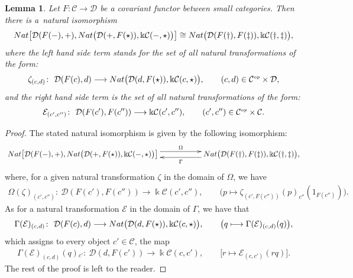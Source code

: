 \documentclass[11pt]{article}
\numberwithin{equation}{section}
\newtheorem{Lemma}[Theorem]{Lemma}
\newcommand{\cD}{{\mathcal D}}
\newcommand{\cE}{{\mathcal E}}
\newcommand{\Sscript}[1]{\scriptscriptstyle{#1}}
\begin{document}
\begin{Lemma}\label{lema:I-II-2}Let $F\colon \mathcal{C} \to \cD$ be a covariant functor between small categories. Then there is a~natural isomorphism
\begin{gather*}
{\rm Nat}\big[ \cD(F(-),+), {\rm Nat} \big( \cD(+, F(\star)), \Bbbk \mathcal{C}(-,\star) \big) \big] \cong {\rm Nat}\big( \cD(F(\dag),F(\ddag)), \Bbbk \mathcal{C}(\dag,\ddag) \big),
\end{gather*}
where the left hand side term stands for the set of all natural transformations of the form:
\begin{gather*}
\zeta_{(c, d)}\colon \ \cD(F(c),d) \longrightarrow{\rm Nat} \big( \cD(d, F(\star)), \Bbbk \mathcal{C}(c,\star) \big), \qquad (c,d) \in \mathcal{C}^{\Sscript{\rm op}} \times \cD,
\end{gather*}
and the right hand side term is the set of all natural transformations of the form:
\begin{gather*}
\cE_{(c', c'')} \colon \ \cD(F(c'), F(c'')) \longrightarrow \Bbbk \mathcal{C}(c',c''), \qquad (c',c'') \in \mathcal{C}^{\Sscript{\rm op}} \times \mathcal{C}.
\end{gather*}
\end{Lemma}
\begin{proof}
The stated natural isomorphism is given by the following isomorphism:
\begin{gather*}
\xymatrix@R=0pt{ {\rm Nat}\big[ \cD(F(-),+), {\rm Nat} \big( \cD(+, F(\star)), \Bbbk \mathcal{C}(-,\star) \big) \big] \ar@<0.90ex>@{->}^-{\Omega}[rr] & & \ar@<0.90ex>@{->}^-{\Gamma}[ll] {\rm Nat}\big( \cD(F(\dag),F(\ddag)), \Bbbk \mathcal{C}(\dag,\ddag) \big),}
\end{gather*}
where, for a given natural transformation $\zeta$ in the domain of $\Omega$, we have
\begin{gather*}
\Omega(\zeta)_{(c',c'')} \colon \ \cD(F(c'),F(c'')) \longrightarrow \Bbbk \mathcal{C}(c',c''), \qquad \big( p \longmapsto \zeta_{(c', F(c''))}(p)_{c''}(1_{F(c'')}) \big).
\end{gather*}
As for a natural transformation $\cE$ in the domain of $\Gamma$, we have that
\begin{gather*}
\Gamma(\cE)_{(c, d)}\colon \ \cD(F(c),d) \longrightarrow {\rm Nat} \big( \cD(d, F(\star)), \Bbbk \mathcal{C}(c,\star) \big), \qquad \big( q \longmapsto \Gamma(\cE)_{(c, d)}(q) \big),
\end{gather*}
which assigns to every object $c' \in \mathcal{C}$, the map
\begin{gather*}
\Gamma(\cE)_{(c, d)}(q) { }_{c'}\colon \ \cD(d,F(c')) \longrightarrow \Bbbk \mathcal{C}(c,c'), \qquad \big[ r \mapsto \cE_{(c, c')}(rq) \big].
\end{gather*}
The rest of the proof is left to the reader.
\end{proof}
\end{document}

